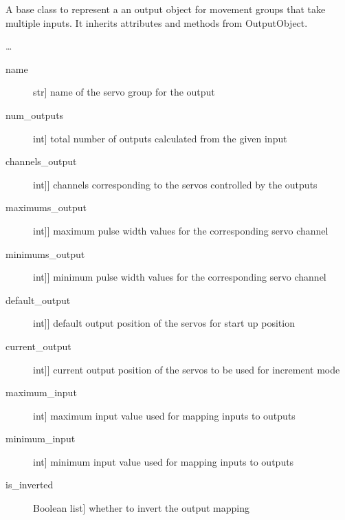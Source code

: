 \documentclass[letterpaper,10pt,english]{sphinxmanual}
\begin{document}
\begin{fulllineitems}
\label{\detokenize{base:MultiInputOutputObject.MultiInputOutputObject}}
\sphinxAtStartPar
A base class to represent a an output object for movement groups that take multiple inputs.
It inherits attributes and methods from OutputObject.

\sphinxAtStartPar
…
\begin{description}
\item[{name}] \leavevmode{[}str{]}
\sphinxAtStartPar
name of the servo group for the output

\item[{num\_outputs}] \leavevmode{[}int{]}
\sphinxAtStartPar
total number of outputs calculated from the given input

\item[{channels\_output}] \leavevmode{[}{[}int{]}{]}
\sphinxAtStartPar
channels corresponding to the servos controlled by the outputs

\item[{maximums\_output}] \leavevmode{[}{[}int{]}{]}
\sphinxAtStartPar
maximum pulse width values for the corresponding servo channel

\item[{minimums\_output}] \leavevmode{[}{[}int{]}{]}
\sphinxAtStartPar
minimum pulse width values for the corresponding servo channel

\item[{default\_output}] \leavevmode{[}{[}int{]}{]}
\sphinxAtStartPar
default output position of the servos for start up position

\item[{current\_output}] \leavevmode{[}{[}int{]}{]}
\sphinxAtStartPar
current output position of the servos to be used for increment mode

\item[{maximum\_input}] \leavevmode{[}int{]}
\sphinxAtStartPar
maximum input value used for mapping inputs to outputs

\item[{minimum\_input}] \leavevmode{[}int{]}
\sphinxAtStartPar
minimum input value used for mapping inputs to outputs

\item[{is\_inverted}] \leavevmode{[}Boolean list{]}
\sphinxAtStartPar
whether to invert the output mapping


\end{description}
\end{fulllineitems}
\end{document}
